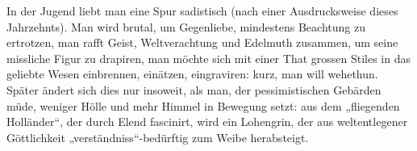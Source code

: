 In der Jugend liebt man eine Spur sadistisch (nach einer Ausdrucksweise dieses Jahrzehnts). Man wird brutal, um Gegenliebe, mindestens Beachtung zu ertrotzen, man rafft Geist, Weltverachtung und Edelmuth zusammen, um seine missliche Figur zu drapiren, man möchte sich mit einer That grossen Stiles in das geliebte Wesen einbrennen, einätzen, eingraviren: kurz, man will wehethun. Später ändert sich dies nur insoweit, als man, der pessimistischen Gebärden müde, weniger Hölle und mehr Himmel in Bewegung setzt: aus dem „fliegenden Holländer“, der durch Elend fascinirt, wird ein Lohengrin, der aus weltentlegener Göttlichkeit „verständniss“-bedürftig zum Weibe herabsteigt.
\par


